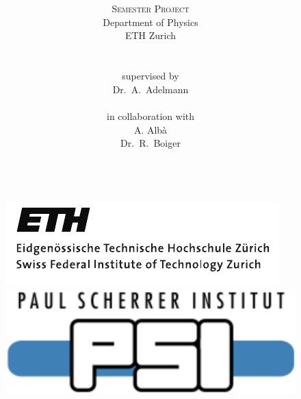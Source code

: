 \documentclass[10pt]{article}
\begin{document}
\begin{titlingpage}
    \begin{figure}
      \includegraphics[scale=0.65]{logos/ethlogo_full.pdf}
      \hfill
      \includegraphics[scale=0.4]{logos/psi_logo_blue.pdf}
    \end{figure}
    \title{\bfseries {\huge {}}}
  \author{
    \textsc{\LARGE Semester Project} \\[5pt]
    \small Department of Physics \\[5pt] \small ETH Zurich \vspace{0.4cm} \\[0.1in]
     \\ 
    \vspace{.2cm} \\
    \small supervised by \\[5pt]
    Dr.\ A.\ Adelmann \\
    \vspace{.2cm} \\
    \small in collaboration with \\[5pt]
    A. Alb\`a \\
    Dr.\ R.\ Boiger \\
    \vspace{.2cm} \\
  }
\maketitle
\thispagestyle{empty}
\newpage 


\end{titlingpage}
\end{document}
